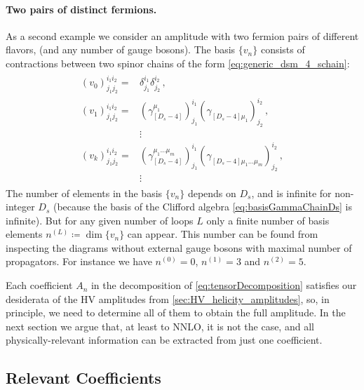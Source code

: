 \paragraph{Two pairs of distinct fermions.}
As a second example we consider an amplitude with two fermion pairs of different flavors, (and any number of gauge bosons). 
The basis $\{v_n\}$ consists of contractions between two spinor chains of the form \cref{eq:generic_dsm_4_schain}:
\begin{align}
  \begin{split} \label{eqn:4qtensors}
    (v_0)_{j_1j_2}^{i_1i_2}   = &
    \delta_{j_1}^{i_1} \delta_{j_2}^{i_2}\,, \\
    (v_1)_{j_1j_2}^{i_1i_2}=
    &(\gamma_{[D_s-4]}^{\mu_1} )_{j_1}^{i_1} 
    (\gamma_{[D_s-4]\mu_1}^{\phantom{\mu}})_{j_2}^{i_2}\,, \\
    & \vdots\\
    (v_k)_{j_1j_2}^{i_1i_2}=
    &(\gamma_{[D_s-4]}^{\mu_1 \ldots  \mu_m})_{j_1}^{i_1}
    (\gamma_{[D_s-4]\mu_1 \ldots \mu_m}^{\phantom{\mu}})_{j_2}^{i_2}\,,\\
    & \vdots\,
  \end{split}
\end{align}
The number of elements in the basis $\{v_n\}$ depends on $D_s$,
and is infinite for non-integer $D_s$ (because the basis of the Clifford algebra \cref{eq:basisGammaChainDs} is infinite).
But for any given number of loops $L$ only a finite number of basis elements $n^{(L)}\coloneqq \dim\{v_n\}$ can appear.
This number can be found from inspecting the diagrams without external gauge bosons 
with maximal number of propagators.
For instance we have $n^{(0)}=0$, $n^{(1)}=3$ and $n^{(2)}=5$.

Each coefficient $A_n$ in the decomposition of \cref{eq:tensorDecomposition} satisfies our desiderata 
of the HV amplitudes from \cref{sec:HV_helicity_amplitudes}, so, in principle, we need to determine all of them to obtain the full amplitude.
In the next section we argue that, at least to NNLO, it is not the case, 
and all physically-relevant information can be extracted from just one coefficient.  

\subsection{Relevant Coefficients}
\label{sec:relevant_tensors}

